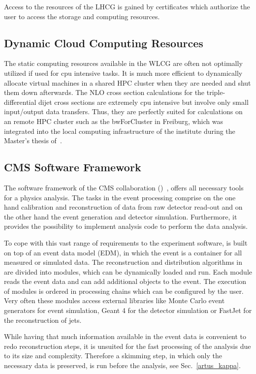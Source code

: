 Access to the resources of the LHCG is gained by certificates which authorize
the user to access the storage and computing resources.

\subsection{Dynamic Cloud Computing Resources}

The static computing resources available in the WLCG are often not optimally
utilized if used for cpu intensive tasks. It is much more efficient to
dynamically allocate virtual machines in a shared HPC cluster when they are
needed and shut them down afterwards. The NLO cross section calculations for the
triple-differential dijet cross sections are extremely cpu intensive but involve
only small input/output data transfers. Thus, they are perfectly suited for
calculations on an remote HPC cluster such as the bwForCluster in Freiburg,
which was integrated into the local computing infrastructure of the institute
during the Master's thesis of~\cite{Fleig:2016aaa}.

\subsection{CMS Software Framework}

The software framework of the CMS collaboration (\CMSSW)~\cite{Bayatyan:838359}, offers
all necessary tools for a physics analysis. The tasks in the event processing
comprise on the one hand calibration and reconstruction of data from raw
detector read-out and on the other hand the event generation and detector
simulation. Furthermore, it provides the possibility to implement analysis code
to perform the data analysis. 

To cope with this vast range of requirements to the experiment software, \CMSSW
is built on top of an event data model (EDM), in which the event is a
container for all measured or simulated data. The reconstruction and
distribution algorithms in \CMSSW are divided into modules, which can be
dynamically loaded and run. Each module reads the event data and can add additional
objects to the event. The execution of modules is ordered
in processing chains which can be configured by the user. Very often these modules
access external libraries like Monte Carlo event generators for event
simulation, Geant 4 for the detector simulation or FastJet for the
reconstruction of jets. 

While having that much information available in the event data is convenient to redo
reconstruction steps, it is unsuited for the fast processing of the analysis due to
its size and complexity. Therefore a skimming step, in which only the necessary
data is preserved, is run before the analysis, see Sec.~\ref{artus_kappa}.

